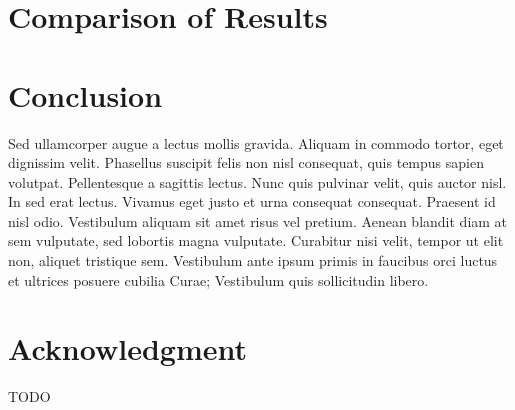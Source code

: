 \documentclass[10pt, conference]{IEEEtran}
\begin{document}
\section{Comparison of Results}
\label{sec:comparison-results}

\section{Conclusion}
\label{sec:conclusion}

Sed ullamcorper augue a lectus mollis gravida. Aliquam in commodo tortor, eget dignissim velit. Phasellus suscipit felis non nisl consequat, quis tempus sapien volutpat. Pellentesque a sagittis lectus. Nunc quis pulvinar velit, quis auctor nisl. In sed erat lectus. Vivamus eget justo et urna consequat consequat. Praesent id nisl odio. Vestibulum aliquam sit amet risus vel pretium. Aenean blandit diam at sem vulputate, sed lobortis magna vulputate. Curabitur nisi velit, tempor ut elit non, aliquet tristique sem. Vestibulum ante ipsum primis in faucibus orci luctus et ultrices posuere cubilia Curae; Vestibulum quis sollicitudin libero.

\section*{Acknowledgment}
TODO

\balance


\end{document}
